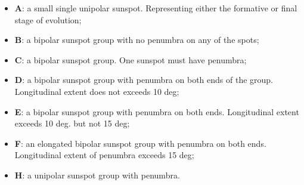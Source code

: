 \begin{itemize}
  \item \textbf{A}: a small single unipolar sunspot. Representing either the formative or final stage of evolution;
  \item \textbf{B}: a bipolar sunspot group with no penumbra on any of the spots;
  \item \textbf{C}: a bipolar sunspot group. One sunspot must have penumbra;
  \item \textbf{D}: a bipolar sunspot group with penumbra on both ends of the group. Longitudinal extent does not exceeds 10 deg;
  \item \textbf{E}: a bipolar sunspot group with penumbra on both ends. Longitudinal extent exceeds 10 deg. but not 15 deg;
  \item \textbf{F}: an elongated bipolar sunspot group with penumbra on both ends. Longitudinal extent of penumbra exceeds 15 deg;
  \item \textbf{H}: a unipolar sunspot group with penumbra.
\end{itemize}






%
%

